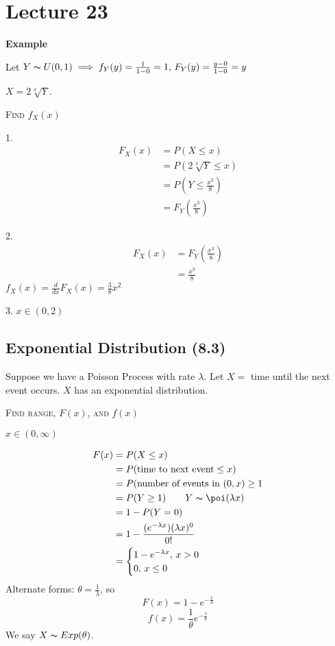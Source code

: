 \section{Lecture 23}
\textbf{Example}

Let $ Y \thicksim U(0,1)\implies f_Y(y)=\frac{1}{1-0}=1,\,
F_Y(y)=\frac{y-0}{1-0}=y $

$ X=2\sqrt[3]{Y} $.

\textsc{Find $ f_X(x) $}

1.
\begin{align*}
    F_X(x)&=P(X\le x)\\
    &=P\left(2\sqrt[3]{Y}\le x\right)\\
    &=P\left(Y\le \frac{x^3}{8}\right)\\
    &=F_Y\left(\frac{x^3}{8} \right)
\end{align*}

2.
\begin{align*}
    F_X(x)&=F_Y\left(\frac{x^3}{8} \right)\\
    &=\frac{x^3}{8}
\end{align*}
$ f_X(x)=\frac{d}{dx}F_X(x)=\frac{3}{8}x^2 $

3. $ x\in(0,2) $

\subsection{Exponential Distribution (8.3)}
Suppose we have a Poisson Process with rate $ \lambda $. Let
$ X= $ time until the next event occurs. $ X $ has an exponential distribution.

\textsc{Find range, $ F(x) $, and $ f(x) $}

$ x\in(0,\infty) $

\begin{align*}
    F(x)&=P(X\le x)\\
    &=P(\text{time to next event}\le x)\\
    &=P(\text{number of events in } (0,x)\ge 1\\
    &=P(Y\ge 1)\qquad Y \thicksim \poi(\lambda x)\\
    &=1-P(Y=0)\\
    &=1-\frac{(e^{-\lambda x})(\lambda x)^0}{0!}\\
    &=
    \begin{cases}
        1-e^{-\lambda x},\, x>0\\
        0,\, x\le 0
    \end{cases}
\end{align*}
Alternate forms: $ \theta=\frac{1}{\lambda} $, so
\[ F(x)=1-e^{-\frac{x}{\theta}} \]
\[ f(x)=\frac{1}{\theta}e^{-\frac{x}{\theta}} \]
We say $ X \thicksim Exp(\theta) $.
